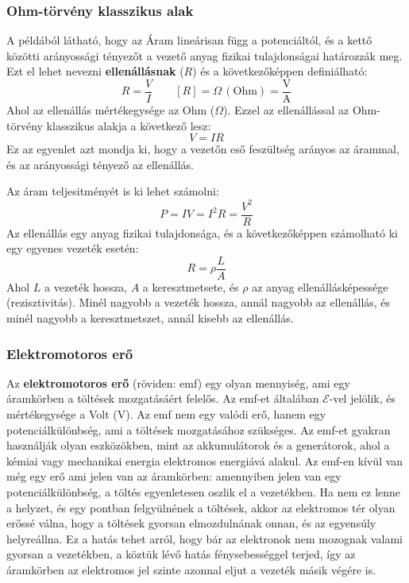 \documentclass[../main.tex]{subfiles}
\begin{document}
\subsubsection{Ohm-törvény klasszikus alak}
A példából látható, hogy az Áram lineárisan függ a potenciáltól, és a kettő közötti arányossági tényezőt a vezető anyag fizikai 
tulajdonságai határozzák meg. Ezt el lehet nevezni \textbf{ellenállásnak} ($R$) és a következőképpen definiálható:
\begin{equation}
    R = \frac{V}{I} \qquad \left[R\right] = \Omega \, (\text{Ohm}) = \frac{\text{V}}{\text{A}}
\end{equation}
Ahol az ellenállás mértékegysége az Ohm ($\Omega$). Ezzel az ellenállással az Ohm-törvény klasszikus alakja a következő lesz:
\begin{equation}
    \boxed{V = IR}
\end{equation}
Ez az egyenlet azt mondja ki, hogy a vezetőn eső feszültség arányos az árammal, és az arányossági tényező az ellenállás.

Az áram teljesitményét is ki lehet számolni:
\begin{equation}
    P = IV = I^2 R = \frac{V^2}{R}
\end{equation}
Az ellenállás egy anyag fizikai tulajdonsága, és a következőképpen számolható ki egy egyenes vezeték esetén:
\begin{equation}
    R = \rho \frac{L}{A}
\end{equation}
Ahol $L$ a vezeték hossza, $A$ a keresztmetsete, és $\rho$ az anyag ellenállásképessége (rezisztivitás). Minél nagyobb a vezeték hossza, annál nagyobb az ellenállás, és minél nagyobb a keresztmetszet, annál kisebb az ellenállás.

\subsubsection{Elektromotoros erő}
Az \textbf{elektromotoros erő} (röviden: emf) egy olyan mennyiség, ami egy áramkörben a töltések mozgatásáért felelős. Az emf-et általában $ \mathcal{E} $-vel jelölik, és mértékegysége a Volt (V). Az emf nem egy valódi erő, hanem egy potenciálkülönbség, ami a töltések mozgatásához szükséges. Az emf-et gyakran használják olyan eszközökben, mint az akkumulátorok és a generátorok, ahol a kémiai vagy mechanikai energia elektromos energiává alakul.
Az emf-en kívül van még egy erő ami jelen van az áramkörben: amennyiben jelen van egy potenciálkülönbség, a töltés egyenletesen oszlik el a vezetékben. Ha nem ez lenne a helyzet, és egy pontban felgyülnének a töltések, akkor az elektromos tér olyan erőssé válna, hogy a töltések gyorsan elmozdulnának onnan, és az egyensúly helyreállna.
Ez a hatás tehet arról, hogy bár az elektronok nem mozognak valami gyorsan a vezetékben, a köztük lévő hatás fénysebességgel terjed, így az áramkörben az elektromos jel szinte azonnal eljut a vezeték másik végére is.
\end{document}
